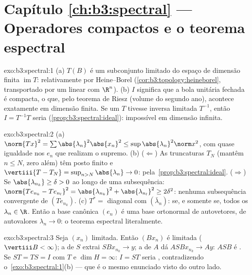 \section*{Capítulo \ref{ch:b3:spectral} --- Operadores compactos
e o teorema espectral}

\begin{solution}{exo:b3:spectral:1}
(a) $T(B)$ é um subconjunto limitado do espaço de dimensão finita
$\operatorname{im}T$: relativamente  por Heine--Borel
(\cref{cor:b3:topology:heineborel}, transportado por um 
linear com $\R^n$).
(b) $I$  significa que a bola unitária fechada é compacta, o que,
pelo teorema de Riesz (volume do segundo ano), acontece exatamente em dimensão
finita. Se um $T$  tivesse inversa limitada $T^{-1}$, então
$I = T^{-1}T$ seria 
(\cref{prop:b3:spectral:ideal}): impossível em dimensão
infinita.
\end{solution}

\begin{solution}{exo:b3:spectral:2}
(a) $\norm{Tx}^2 = \sum\abs{\lambda_n}^2\abs{x_n}^2 \leq
\sup\abs{\lambda_n}^2\norm x^2$, com quase igualdade nos
$e_n$ que realizam o supremo.
(b) ($\Leftarrow$) As truncaturas $T_N$ (mantêm $n \leq N$,
zero além) têm posto finito e $\vertiii{T - T_N} =
\sup_{n>N}\abs{\lambda_n} \to 0$:  pela~\cref{prop:b3:spectral:ideal}. ($\Rightarrow$) Se
$\abs{\lambda_{n_k}} \geq \delta > 0$ ao longo de uma subsequência:
$\norm{Te_{n_k} - Te_{n_l}}^2 = \abs{\lambda_{n_k}}^2 +
\abs{\lambda_{n_l}}^2 \geq 2\delta^2$: nenhuma subsequência
convergente de $(Te_{n_k})$.
(c) $T^* = $ diagonal com $(\bar\lambda_n)$:  se, e somente se,
todos os $\lambda_n \in \R$. Então a base canônica $(e_n)$ é uma
base ortonormal de autovetores, de autovalores $\lambda_n \to
0$: o teorema espectral literalmente.
\end{solution}

\begin{solution}{exo:b3:spectral:3}
Seja $(x_n)$ limitada. Então $(Bx_n)$ é limitada
($\vertiii B < \infty$); a  de $S$ extrai
$SBx_{n_k} \to y$; a  de $A$ dá $ASBx_{n_k} \to
Ay$: $ASB$ é . Se $ST = TS = I$ com $T$  e
$\dim H = \infty$: $I = ST$ seria , contradizendo
o~\cref{exo:b3:spectral:1}(b) --- que é o mesmo enunciado
visto do outro lado.
\end{solution}

